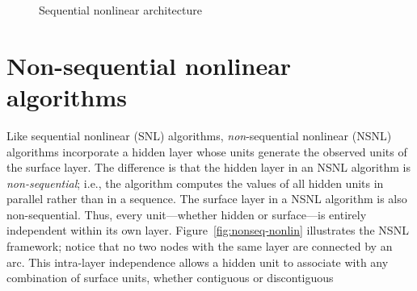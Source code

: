  \begin{figure}[t]
 \begin{mdframed}
 \begin{center}
 \end{center}
 \caption{Sequential nonlinear architecture}
 \label{fig:seq-nonlin}
 \end{mdframed}	
 \end{figure}

\section{Non-sequential nonlinear algorithms}
\label{subsec:nonseq-nonlin}
 Like sequential nonlinear (SNL) algorithms, \textit{non}-sequential
 nonlinear (NSNL) algorithms incorporate a hidden layer whose units generate the observed
 units of the surface layer.
The difference is that the hidden layer in an NSNL algorithm is \emph{non-sequential}; 
i.e., the algorithm computes the values of all hidden units in parallel rather than in a sequence.
The surface layer in a NSNL algorithm is also non-sequential.
 Thus, every unit---whether hidden or surface---is entirely independent
 within its own layer. Figure~\ref{fig:nonseq-nonlin} illustrates the NSNL framework; notice that no two nodes with the same layer are connected by an arc.
This intra-layer independence allows a hidden unit to associate with
any combination of surface units, whether contiguous or discontiguous

